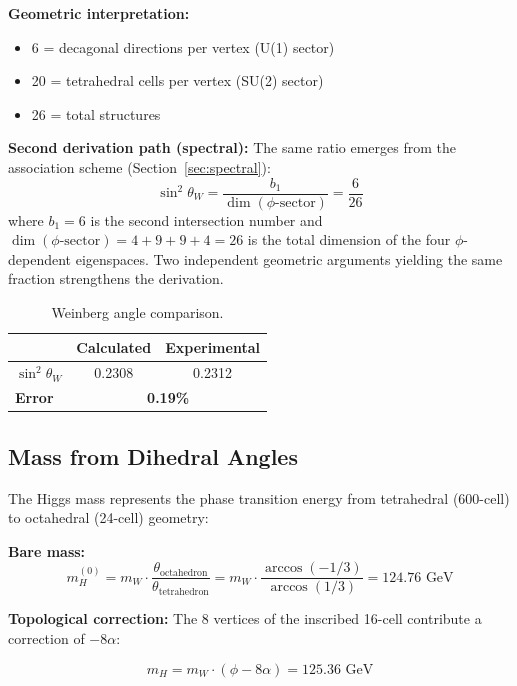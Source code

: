 \documentclass[12pt,a4paper]{article}
\begin{document}
\textbf{Geometric interpretation:}
\begin{itemize}
    \item 6 = decagonal directions per vertex (U(1) sector)
    \item 20 = tetrahedral cells per vertex (SU(2) sector)
    \item 26 = total structures
\end{itemize}

\textbf{Second derivation path (spectral):} The same ratio emerges from the association scheme (Section~\ref{sec:spectral}):
\begin{equation}
\sin^2\theta_W = \frac{b_1}{\dim(\phi\text{-sector})} = \frac{6}{26}
\end{equation}
where $b_1 = 6$ is the second intersection number and $\dim(\phi\text{-sector}) = 4 + 9 + 9 + 4 = 26$ is the total dimension of the four $\phi$-dependent eigenspaces. Two independent geometric arguments yielding the same fraction strengthens the derivation.

\begin{table}[H]
\centering
\begin{tabular}{lcc}
\toprule
& \textbf{Calculated} & \textbf{Experimental} \\
\midrule
$\sin^2\theta_W$ & 0.2308 & 0.2312 \\
\textbf{Error} & \multicolumn{2}{c}{\textbf{0.19\%}} \\
\bottomrule
\end{tabular}
\caption{Weinberg angle comparison.}
\end{table}


\subsection{Mass from Dihedral Angles}

The Higgs mass represents the phase transition energy from tetrahedral (600-cell) to octahedral (24-cell) geometry:

\textbf{Bare mass:}
\begin{equation}
m_H^{(0)} = m_W \cdot \frac{\theta_{\text{octahedron}}}{\theta_{\text{tetrahedron}}} = m_W \cdot \frac{\arccos(-1/3)}{\arccos(1/3)} = 124.76 \text{ GeV}
\end{equation}

\textbf{Topological correction:}
The 8 vertices of the inscribed 16-cell contribute a correction of $-8\alpha$:

\begin{equation}
\boxed{m_H = m_W \cdot (\phi - 8\alpha) = 125.36 \text{ GeV}}
\end{equation}
\end{document}
